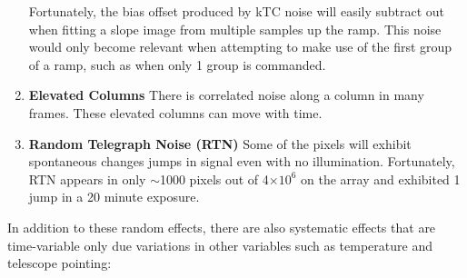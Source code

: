 \documentclass[]{aastex62}
\begin{document}
\begin{enumerate}[noitemsep]
	Fortunately, the bias offset produced by kTC noise will easily subtract out when fitting a slope image from multiple samples up the ramp.
	This noise would  only become relevant when attempting to make use of the first group of a ramp, such as when only 1 group is commanded.
	\item \textbf{Elevated Columns} There is correlated noise along a column in many frames. These elevated columns can move with time.
	\item \textbf{Random Telegraph Noise (RTN)} Some of the pixels will exhibit spontaneous changes jumps in signal even with no illumination. Fortunately, RTN appears in only $\sim$1000 pixels out of 4$\times 10^6$ on the array and exhibited 1 jump in a 20 minute exposure.
\end{enumerate}

In addition to these random effects, there are also systematic effects that are time-variable only due variations in other variables such as temperature and telescope pointing:
\end{document}
